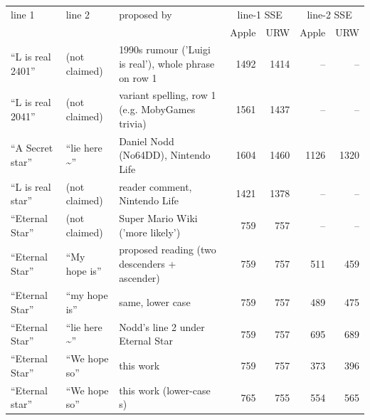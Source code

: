 \begin{tabular}{>{\raggedright\arraybackslash}p{2.7cm}>{\raggedright\arraybackslash}p{2.0cm}>{\raggedright\arraybackslash}p{4.0cm}rrrr}\toprule
 line 1 & line 2 & proposed by & \multicolumn{2}{c}{line-1 SSE} & \multicolumn{2}{c}{line-2 SSE} \\
 & & & Apple & URW & Apple & URW \\ \midrule
``L is real 2401'' & (not claimed) & 1990s rumour ('Luigi is real'), whole phrase on row 1 & 1492 & 1414 & -- & -- \\
``L is real 2041'' & (not claimed) & variant spelling, row 1 (e.g. MobyGames trivia) & 1561 & 1437 & -- & -- \\
``A Secret star'' & ``lie here \textasciitilde{}'' & Daniel Nodd (No64DD), Nintendo Life & 1604 & 1460 & 1126 & 1320 \\
``L is real star'' & (not claimed) & reader comment, Nintendo Life & 1421 & 1378 & -- & -- \\
``Eternal Star'' & (not claimed) & Super Mario Wiki ('more likely') & 759 & 757 & -- & -- \\
``Eternal Star'' & ``My hope is'' & proposed reading (two descenders + ascender) & 759 & 757 & 511 & 459 \\
``Eternal Star'' & ``my hope is'' & same, lower case & 759 & 757 & 489 & 475 \\
``Eternal Star'' & ``lie here \textasciitilde{}'' & Nodd's line 2 under Eternal Star & 759 & 757 & 695 & 689 \\
``Eternal Star'' & ``We hope so'' & this work & 759 & 757 & 373 & 396 \\
``Eternal star'' & ``We hope so'' & this work (lower-case s) & 765 & 755 & 554 & 565 \\
\bottomrule\end{tabular}
